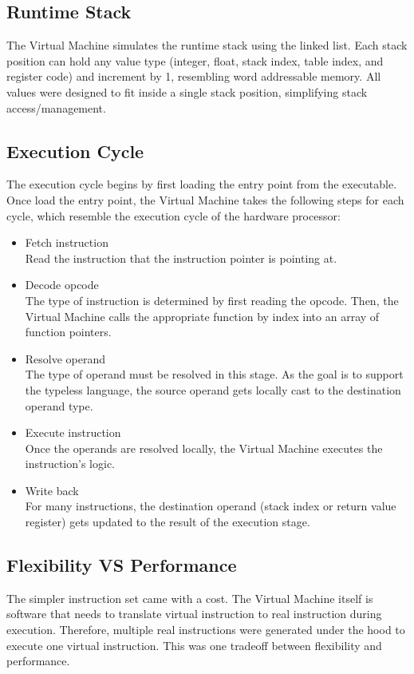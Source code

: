 \documentclass[manuscript,screen,nonacm]{acmart}
\begin{document}
\subsection{Runtime Stack}
The Virtual Machine simulates the runtime stack using the linked list. Each stack position can hold any value type (integer, float, stack index, table index, and register code) and increment by 1, resembling word addressable memory. All values were designed to fit inside a single stack position, simplifying stack access/management. 

\subsection{Execution Cycle}
The execution cycle begins by first loading the entry point from the executable. Once load the entry point, the Virtual Machine takes the following steps for each cycle, which resemble the execution cycle of the hardware processor:
\begin{itemize}
    \item Fetch instruction \\
	Read the instruction that the instruction pointer is pointing at.
    \item Decode opcode \\
	The type of instruction is determined by first reading the opcode. Then, the Virtual Machine calls the appropriate function by index into an array of function pointers.
    \item Resolve operand \\
	The type of operand must be resolved in this stage. As the goal is to support the typeless language, the source operand gets locally cast to the destination operand type. 
    \item Execute instruction \\
	Once the operands are resolved locally, the Virtual Machine executes the instruction's logic.
    \item Write back \\
	For many instructions, the destination operand (stack index or return value register) gets updated to the result of the execution stage. 
\end{itemize}

\subsection{Flexibility VS Performance}
The simpler instruction set came with a cost. The Virtual Machine itself is software that needs to translate virtual instruction to real instruction during execution. Therefore, multiple real instructions were generated under the hood to execute one virtual instruction. This was one tradeoff between flexibility and performance.
\end{document}
